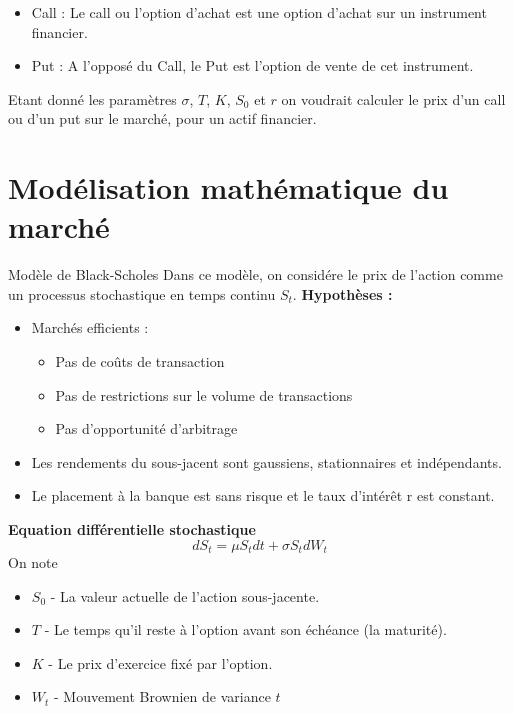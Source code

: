 \documentclass{beamer}
\begin{document}
\begin{frame}
  \begin{itemize}
    \item Call : Le call ou l'option d'achat est une option d'achat sur un instrument financier.
    \item Put : A l'opposé du Call, le Put est l'option de vente de cet instrument.
  \end{itemize}
  Etant donné les paramètres $\sigma$, $T$, $K$, $S_0$ et $r$ on voudrait calculer le prix d'un call ou d'un put sur le marché, pour un actif financier.

\end{frame}

\section{Modélisation mathématique du marché}
\begin{frame}{Modèle de Black-Scholes}
  Dans ce modèle, on considére le prix de l'action comme un processus stochastique en temps continu $S_t$. \newline
  \textbf{Hypothèses :}
  \begin{itemize}
    \item  Marchés efficients :
    \begin{itemize}
      \item Pas de coûts de transaction
      \item Pas de restrictions sur le volume de transactions
      \item Pas d'opportunité d'arbitrage
    \end{itemize}
    \item Les rendements du sous-jacent sont gaussiens, stationnaires et indépendants.
    \item Le placement à la banque est sans risque et le taux d'intérêt r est constant.
  \end{itemize}
\end{frame}
\begin{frame}
  \textbf{Equation différentielle stochastique}
  $$ dS_t = \mu S_t dt + \sigma S_t dW_t $$
On note \begin{itemize}
      \item $S_0$ - La valeur actuelle de l'action sous-jacente.
      \item $T$ - Le temps qu'il reste à l'option avant son échéance (la maturité).
      \item $K$ - Le prix d'exercice fixé par l'option.
      \item $W_t$ - Mouvement Brownien de variance $t$
\end{itemize}
\end{frame}
\end{document}
